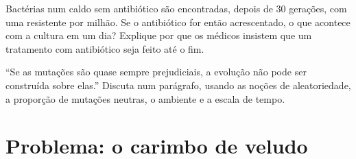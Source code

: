 \begin{exercise}[$\star\star\star$]\label{exo:g11:mutations:14}
Bactérias num caldo sem antibiótico são encontradas, depois de 30
gerações, com uma  resistente por milhão. Se o antibiótico for
então acrescentado, o que acontece com a cultura em um dia? Explique
por que os médicos insistem que um tratamento com antibiótico seja
feito até o fim.
\end{exercise}

\begin{exercise}[$\star\star\star$]\label{exo:g11:mutations:15}
``Se as mutações são quase sempre prejudiciais, a evolução não pode ser
construída sobre elas.'' Discuta num parágrafo, usando as noções de
aleatoriedade, a proporção de mutações neutras, o ambiente e a escala
de tempo.
\end{exercise}

\section{Problema: o carimbo de veludo}

